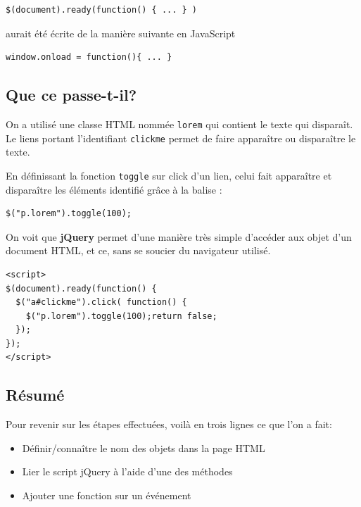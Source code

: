 \documentclass[10pt,a4paper,titlepage]{article}
\begin{document}
\begin{lstlisting}
$(document).ready(function() { ... } )
\end{lstlisting}

aurait été écrite de la manière suivante en JavaScript  

\begin{lstlisting}
window.onload = function(){ ... }
\end{lstlisting}

\subsection{Que ce passe-t-il?}

On a utilisé une classe HTML nommée \texttt{lorem} qui contient le texte qui disparaît. Le liens portant l'identifiant \texttt{clickme} permet de faire apparaître ou disparaître le texte. 

En définissant la fonction \texttt{toggle} sur click d'un lien, celui fait apparaître et  disparaître les éléments identifié grâce à la balise : 

\begin{lstlisting}
$("p.lorem").toggle(100);
\end{lstlisting}

On voit que \textbf{jQuery} permet d'une manière très simple d'accéder aux objet d'un document HTML, et ce, sans se soucier du navigateur utilisé.

\begin{lstlisting}
<script>
$(document).ready(function() {
  $("a#clickme").click( function() {
    $("p.lorem").toggle(100);return false;
  });
});
</script>
\end{lstlisting}

\subsection{Résumé}

Pour revenir sur les étapes effectuées, voilà en trois lignes ce que l'on a fait: \\

\begin{itemize}
	\item Définir/connaître le nom des objets dans la page HTML
	\item Lier le script jQuery à l'aide d'une des méthodes
	\item Ajouter une fonction sur un événement
\end{itemize}
\end{document}
